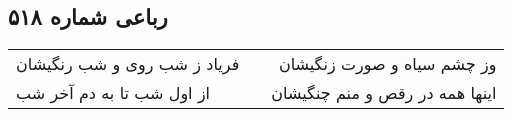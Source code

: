 \begin{center}
\section*{رباعی شماره ۵۱۸}
\label{sec:sh518}
\begin{longtable}{l p{0.5cm} r}
فریاد ز شب روی و شب رنگیشان
&&
وز چشم سیاه و صورت زنگیشان
\\
از اول شب تا به دم آخر شب
&&
اینها همه در رقص و منم چنگیشان
\\
\end{longtable}
\end{center}
